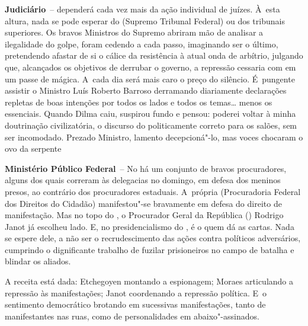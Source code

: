 \textbf{Judiciário}~-- dependerá cada vez mais da ação individual de
juízes. À~esta altura, nada se pode esperar do  (Supremo Tribunal
Federal) ou dos tribunais superiores. Os bravos Ministros do Supremo
abriram mão de analisar a ilegalidade do golpe, foram cedendo a cada
passo, imaginando ser o último, pretendendo afastar de si o cálice da
resistência à atual onda de arbítrio, julgando que, alcançados os
objetivos de derrubar o governo, a repressão cessaria com em um passe de
mágica. A~cada dia será mais caro o preço do silêncio. É~pungente
assistir o Ministro Luís Roberto Barroso derramando diariamente
declarações repletas de boas intenções por todos os lados e todos os
temas… menos os essenciais. Quando Dilma caiu, suspirou fundo e
pensou: poderei voltar à minha doutrinação civilizatória, o discurso do
politicamente correto para os salões, sem ser incomodado. Prezado
Ministro, lamento decepcioná"-lo, mas voces chocaram o ovo da serpente

\textbf{Ministério Público Federal}~-- No  há um conjunto de bravos
procuradores, alguns dos quais correram às delegacias no domingo, em
defesa dos meninos presos, ao contrário dos procuradores estaduais. A~própria  (Procuradoria Federal dos Direitos do Cidadão)
manifestou"-se bravamente em defesa do direito de manifestação. Mas no
topo do , o Procurador Geral da República () Rodrigo Janot já
escolheu lado. E, no presidencialismo do , é o  quem dá as cartas.
Nada se espere dele, a não ser o recrudescimento das ações contra
políticos adversários, cumprindo o dignificante trabalho de fuzilar
prisioneiros no campo de batalha e blindar os aliados.

A receita está dada: Etchegoyen montando a espionagem; Moraes
articulando a repressão às manifestações; Janot coordenando a repressão
política. E~o sentimento democrático brotando em sucessivas
manifestações, tanto de manifestantes nas ruas, como de personalidades
em abaixo"-assinados.
